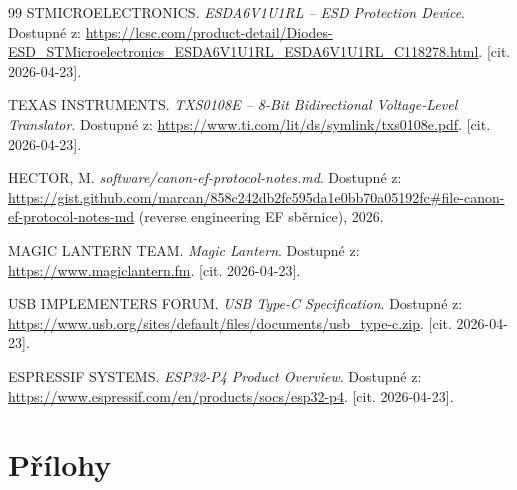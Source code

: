 \documentclass[12pt, a4paper, oneside]{report}
\begin{document}
\begin{thebibliography}{99}
 STMICROELECTRONICS. \textit{ESDA6V1U1RL -- ESD Protection Device}. Dostupné z: \url{https://lcsc.com/product-detail/Diodes-ESD_STMicroelectronics_ESDA6V1U1RL_ESDA6V1U1RL_C118278.html}. [cit. 2026-04-23].

 TEXAS INSTRUMENTS. \textit{TXS0108E -- 8-Bit Bidirectional Voltage-Level Translator}. Dostupné z: \url{https://www.ti.com/lit/ds/symlink/txs0108e.pdf}. [cit. 2026-04-23].

 HECTOR, M. \textit{software/canon-ef-protocol-notes.md}. Dostupné z: \url{https://gist.github.com/marcan/858c242db2fc595da1e0bb70a05192fc#file-canon-ef-protocol-notes-md} (reverse engineering EF sběrnice), 2026.

 MAGIC LANTERN TEAM. \textit{Magic Lantern}. Dostupné z: \url{https://www.magiclantern.fm}. [cit. 2026-04-23].

 USB IMPLEMENTERS FORUM. \textit{USB Type-C Specification}. Dostupné z: \url{https://www.usb.org/sites/default/files/documents/usb_type-c.zip}. [cit. 2026-04-23].

 ESPRESSIF SYSTEMS. \textit{ESP32-P4 Product Overview}. Dostupné z: \url{https://www.espressif.com/en/products/socs/esp32-p4}. [cit. 2026-04-23].


\end{thebibliography}

\chapter*{Přílohy}
\end{document}
